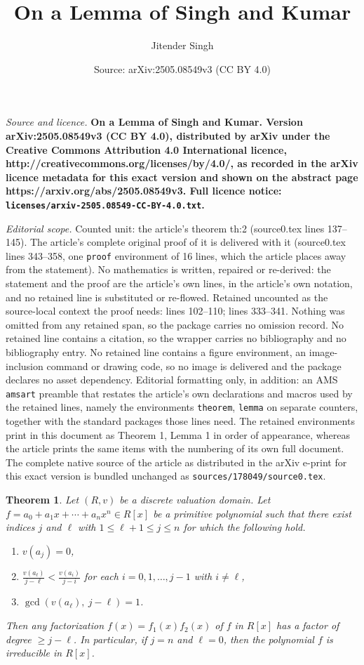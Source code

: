 \documentclass[10pt,a4paper]{amsart}
\title{\bf On a Lemma of Singh and Kumar}
\author{Jitender Singh}
\date{Source: arXiv:2505.08549v3 (CC BY 4.0)}
\newtheorem{theorem}{Theorem}
\begin{document}
\maketitle

\noindent\emph{Source and licence.} \bf On a Lemma of Singh and Kumar. Version arXiv:2505.08549v3 (CC BY 4.0), distributed by arXiv under the Creative Commons Attribution 4.0 International licence, http://creativecommons.org/licenses/by/4.0/, as recorded in the arXiv licence metadata for this exact version and shown on the abstract page https://arxiv.org/abs/2505.08549v3. Full licence notice: \texttt{licenses/arxiv-2505.08549-CC-BY-4.0.txt}.\par\smallskip

\noindent\textit{Editorial scope.} Counted unit: the article's theorem th:2 (source0.tex lines 137--145). The article's complete original proof of it is delivered with it (source0.tex lines 343--358, one \texttt{proof} environment of 16 lines, which the article places away from the statement). No mathematics is written, repaired or re-derived: the statement and the proof are the article's own lines, in the article's own notation, and no retained line is substituted or re-flowed.  Retained uncounted as the source-local context the proof needs: lines 102--110; lines 333--341.  Nothing was omitted from any retained span, so the package carries no omission record.  No retained line contains a citation, so the wrapper carries no bibliography and no bibliography entry.  No retained line contains a figure environment, an image-inclusion command or drawing code, so no image is delivered and the package declares no asset dependency.  Editorial formatting only, in addition: an AMS \texttt{amsart} preamble that restates the article's own declarations and macros used by the retained lines, namely the environments \texttt{theorem}, \texttt{lemma} on separate counters, together with the standard packages those lines need.  The retained environments print in this document as Theorem 1, Lemma 1 in order of appearance, whereas the article prints the same items with the numbering of its own full document.  The complete native source of the article as distributed in the arXiv e-print for this exact version is bundled unchanged as \texttt{sources/178049/source0.tex}.
\begin{theorem}\label{th:1}
Let $(R,v)$  be a discrete valuation domain. Let $f=a_0 + a_1x + \cdots + a_nx^n \in {R}[x]$ be a primitive polynomial such that there exist indices $j$ and $\ell$ with $1\leq \ell+1 \leq j\leq n$ for which the following hold.
\begin{enumerate}[label=$(\roman*)$]
\item $v(a_j)=0$,
\item $\frac{v(a_\ell)}{j-\ell}<\frac{v(a_i)}{j-i}$ for each $i=0,1,\ldots, j-1$ with $i\neq \ell$,
\item $\gcd(v(a_\ell),~j-\ell) = 1$.
\end{enumerate}
Then any factorization $f(x)=f_1(x)f_2(x)$ of $f$ in $R[x]$ has a factor of degree $\geq j-\ell$. In particular, if $j=n$ and $\ell=0$, then the polynomial $f$ is irreducible in $R[x]$.
\end{theorem}
\end{document}
